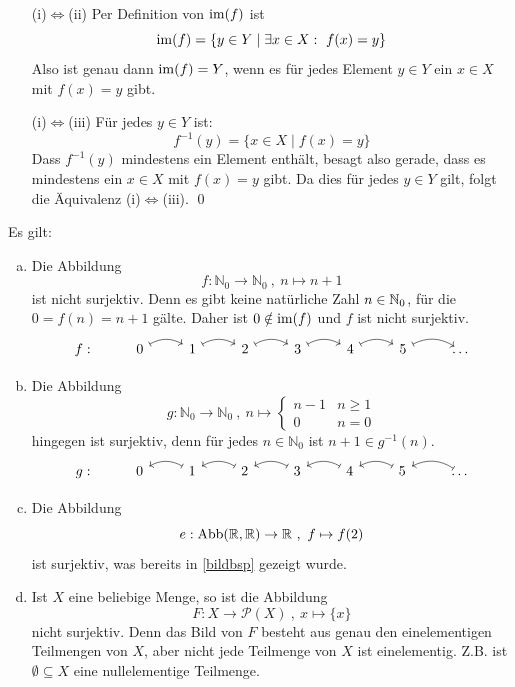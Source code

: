 \begin{bew}
	\begin{itemize}
    \item[(i)$\Leftrightarrow$(ii)] Per Definition von $\operatorname{im}(f)$ ist
    \[ \operatorname{im}(f) = \{y\in Y\mid \exists x\in X:\ f(x)=y \} \]
    Also ist genau dann $\operatorname{im}(f)=Y$, wenn es für jedes Element $y\in Y$ ein $x\in X$ mit $f(x)=y$ gibt.
		\item[(i)$\Leftrightarrow$(iii)] 
    Für jedes $y\in Y$ ist:
    \[ f^{-1}(y) = \{x\in X\mid f(x)=y \} \]
    Dass $f^{-1}(y)$ mindestens ein Element enthält, besagt also gerade, dass es mindestens ein $x\in X$ mit $f(x)=y$ gibt. Da dies für jedes $y\in Y$ gilt, folgt die Äquivalenz (i)$\Leftrightarrow$(iii). \qed
	\end{itemize}
\end{bew}





\begin{bsp}
Es gilt:
\begin{enumerate}[a)]
 \item Die Abbildung
 \[ f:\mathbb{N}_0 \to \mathbb{N}_0 \ ,\ n \mapsto n+1 \]
 ist nicht surjektiv. Denn es gibt keine natürliche Zahl $n\in {\mathbb N}_0$, für die $0=f(n)=n+1$ gälte. Daher ist $0\notin \operatorname{im}(f)$ und $f$ ist nicht surjektiv.
  \[ \begin{tikzcd}
 f: & 0 \ar[r, bend left, mapsto]& 1 \ar[r, bend left, mapsto]& 2 \ar[r, bend left, mapsto]& 3 \ar[r, bend left, mapsto]& 4 \ar[r, bend left, mapsto]& 5 \ar[r, bend left, mapsto]& \dots
    \end{tikzcd} \]
 \item Die Abbildung
 \[ g: \mathbb{N}_0 \to \mathbb{N}_0\ ,\ n \mapsto \begin{cases}
n-1 & n\geq 1 \\
0 & n=0
\end{cases}  \]
 hingegen ist surjektiv, denn für jedes $n \in \mathbb{N}_0$ ist $n+1\in g^{-1}(n)$.
 \[ \begin{tikzcd}
g: & 0  & 1 \ar[l, bend right, mapsto] & 2 \ar[l, bend right, mapsto] & 3 \ar[l, bend right, mapsto] & 4  \ar[l, bend right, mapsto] & 5  \ar[l, bend right, mapsto] &  \ar[l, bend right, mapsto]  \dots
    \end{tikzcd} \]
 \item Die Abbildung
 \[ e : \text{Abb}({\mathbb R},{\mathbb R}) \to {\mathbb R} \ ,\ f\mapsto f(2) \]
 ist surjektiv, was bereits in \cref{bildbsp} gezeigt wurde.
 \item Ist $X$ eine beliebige Menge, so ist die Abbildung
 \[ F : X\to \mathcal{P}(X) \ ,\ x\mapsto \{x\} \]
 nicht surjektiv. Denn das Bild von $F$ besteht aus genau den einelementigen Teilmengen von $X$, aber nicht jede Teilmenge von $X$ ist einelementig. Z.B. ist $\emptyset\subseteq X$ eine nullelementige Teilmenge.
\end{enumerate}
\end{bsp}





